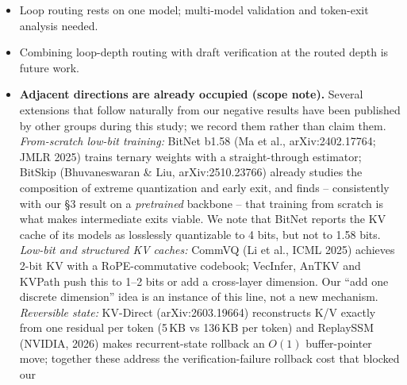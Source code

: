 \documentclass[11pt,a4paper]{article}
\begin{document}
\begin{itemize}[leftmargin=*]
        64 tok/s single-prompt and $\sim$640--1280 tok/s batched. Our draft heads depend on hidden
        states that vLLM does not expose, so they are bound to the HF harness and their vLLM
        adaptation (e.g. a Medusa/EAGLE-style proposer) is future work. Importantly, the mechanism
        itself is not framework-specific: vLLM's built-in n-gram speculative decoding gives
        \textbf{1.806$\times$} (640$\to$1156 tok/s) on the same model, confirming that
        verification-based multi-token decoding remains effective in a production stack.
        The absolute throughput leap from the execution framework (CUDA graphs, PagedAttention)
        is far larger than any architecture-level gain we measured; we report both facts.
        Shared-GPU timings are bimodal; speedups use single-process stable-fast mode.
  \item Loop routing rests on one model; multi-model validation and token-exit analysis needed.
  \item Combining loop-depth routing with draft verification at the routed depth is future work.
  \item \textbf{Adjacent directions are already occupied (scope note).} Several extensions that
        follow naturally from our negative results have been published by other groups during
        this study; we record them rather than claim them. \emph{From-scratch low-bit training:}
        BitNet b1.58 (Ma et al., arXiv:2402.17764; JMLR 2025) trains ternary weights with a
        straight-through estimator; BitSkip (Bhuvaneswaran \& Liu, arXiv:2510.23766) already
        studies the composition of extreme quantization and early exit, and finds -- consistently
        with our \S3 result on a \emph{pretrained} backbone -- that training from scratch is what
        makes intermediate exits viable. We note that BitNet reports the KV cache of its models
        as losslessly quantizable to 4 bits, but not to 1.58 bits.
        \emph{Low-bit and structured KV caches:} CommVQ (Li et al., ICML 2025) achieves 2-bit
        KV with a RoPE-commutative codebook; VecInfer, AnTKV and KVPath push this to 1--2 bits
        or add a cross-layer dimension. Our ``add one discrete dimension'' idea is an instance
        of this line, not a new mechanism. \emph{Reversible state:} KV-Direct (arXiv:2603.19664)
        reconstructs K/V exactly from one residual per token (5\,KB vs 136\,KB per token) and
        ReplaySSM (NVIDIA, 2026) makes recurrent-state rollback an $O(1)$ buffer-pointer move;
        together these address the verification-failure rollback cost that blocked our

\end{itemize}
\end{document}

